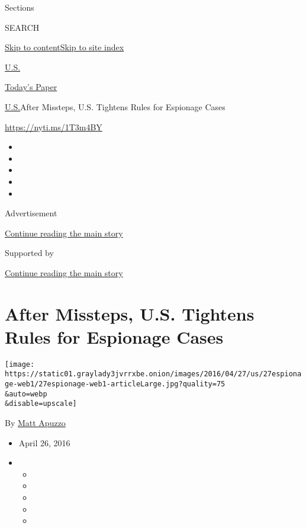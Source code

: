Sections

SEARCH

\protect\hyperlink{site-content}{Skip to
content}\protect\hyperlink{site-index}{Skip to site index}

\href{https://www.nytimes3xbfgragh.onion/section/us}{U.S.}

\href{https://myaccount.nytimes3xbfgragh.onion/auth/login?response_type=cookie\&client_id=vi}{}

\href{https://www.nytimes3xbfgragh.onion/section/todayspaper}{Today's
Paper}

\href{/section/us}{U.S.}\textbar{}After Missteps, U.S. Tightens Rules
for Espionage Cases

\url{https://nyti.ms/1T3m4BY}

\begin{itemize}
\item
\item
\item
\item
\item
\end{itemize}

Advertisement

\protect\hyperlink{after-top}{Continue reading the main story}

Supported by

\protect\hyperlink{after-sponsor}{Continue reading the main story}

\hypertarget{after-missteps-us-tightens-rules-for-espionage-cases}{%
\section{After Missteps, U.S. Tightens Rules for Espionage
Cases}\label{after-missteps-us-tightens-rules-for-espionage-cases}}

\texttt{[image: https://static01.graylady3jvrrxbe.onion/images/2016/04/27/us/27espionage-web1/27espionage-web1-articleLarge.jpg?quality=75\\\&auto=webp\\\&disable=upscale]}

By \href{http://www.nytimes3xbfgragh.onion/by/matt-apuzzo}{Matt Apuzzo}

\begin{itemize}
\item
  April 26, 2016
\item
  \begin{itemize}
  \item
  \item
  \item
  \item
  \item
  \end{itemize}
\end{itemize}

